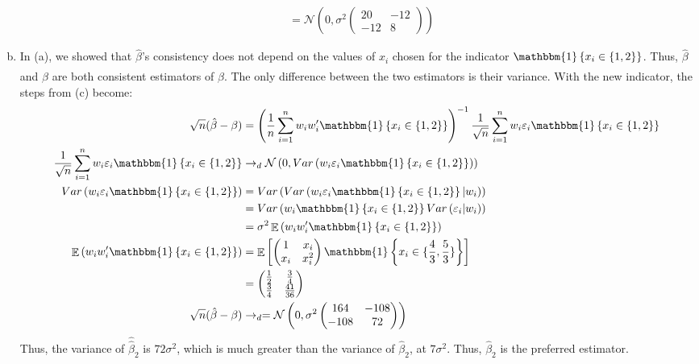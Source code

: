 \documentclass{article}
\newcommand{\N}{\mathcal{N}}
\newcommand{\est}[1]{\frac{1}{#1}\sum_{i=1}^{#1}}
\newcommand{\sumn}{\sum_{i=1}^{n}}
\newcommand{\bhat}{\hat{\beta}}
\newcommand{\one}[1]{\mathbbm{1}\left\{#1\right\}}
\DeclareMathOperator{\E}{\mathbb{E}}%
\begin{document}
\begin{enumerate}[(a)]
\begin{align*}
									&= \N\left(0,\sigma^2\begin{pmatrix} 20 & -12 \\ -12 & 8 \end{pmatrix}\right)	
		\end{align*}
	
	\item In (a), we showed that $\bhat$'s consistency does not depend on the values of $x_i$ chosen for the indicator ${\one{x_i\in\{1,2\}}}$. Thus, $\bhat$ and $\hat{\bhat}$ are both consistent estimators of $\beta$. The only difference between the two estimators is their variance. With the new indicator, the steps from (c) become:
		\begin{align*}
			\sqrt{n}(\bhat-\beta) &= \left(\est{n}w_iw_i'\one{x_i\in\{1,2\}}\right)^{-1}\frac{1}{\sqrt{n}}\sumn w_i\varepsilon_i\one{x_i\in\{1,2\}}	\\
			\frac{1}{\sqrt{n}}\sumn w_i\varepsilon_i\one{x_i\in\{1,2\}} &\rightarrow_d \N\left(0,Var\left(w_i\varepsilon_i\one{x_i\in\{1,2\}}\right)\right)	\\
			Var\left(w_i\varepsilon_i\one{x_i\in\{1,2\}}\right) &= Var\left(Var\left(w_i\varepsilon_i\one{x_i\in\{1,2\}}|w_i\right)\right)	\\
																&= Var\left(w_i\one{x_i\in\{1,2\}}Var\left(\varepsilon_i|w_i\right)\right)	\\
																&= \sigma^2 \E\left(w_iw_i'\one{x_i\in\{1,2\}}\right)	\\
					\E\left(w_iw_i'\one{x_i\in\{1,2\}}\right)	&= \E\left[\begin{pmatrix} 1 & x_i \\ x_i & x_i^2 \end{pmatrix}\one{x_i\in\{\frac{4}{3},\frac{5}{3}\}}\right]	\\
																&=\begin{pmatrix} \frac{1}{2} & \frac{3}{4} \\ \frac{3}{4} & \frac{41}{36} \end{pmatrix}	\\
			\sqrt{n}(\bhat-\beta) 	&\rightarrow_d	= \N\left(0,\sigma^2\begin{pmatrix} 164 & -108 \\ -108 & 72 \end{pmatrix}\right)	
		\end{align*}
		Thus, the variance of $\hat{\bhat}_2$ is $72\sigma^2$, which is much greater than the variance of $\bhat_2$, at $7\sigma^2$. Thus, $\bhat_2$ is the preferred estimator.
		

\end{enumerate}
\end{document}
